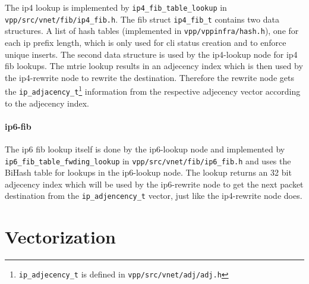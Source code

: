 



The ip4 lookup is implemented by \lstinline|ip4_fib_table_lookup| in
\lstinline|vpp/src/vnet/fib/ip4_fib.h|. The \Ac{fib} struct
\lstinline|ip4_fib_t| contains two data structures. A list of hash
tables (implemented in \lstinline|vpp/vppinfra/hash.h|), one for each
ip prefix length, which is only used for \Ac{cli} status creation and
to enforce unique inserts. The second data structure is used by the
ip4-lookup node for \Ac{ip4} \Ac{fib} lookups. The mtrie lookup
results in an adjecency index which is then used by the ip4-rewrite
node to rewrite the destination. Therefore the rewrite node gets the
\lstinline|ip_adjacency_t|\footnote{\lstinline|ip_adjecency_t| is
defined in \lstinline|vpp/src/vnet/adj/adj.h|} information from the
respective adjecency vector according to the adjecency index.


\paragraph{ip6-fib}

The \Ac{ip6} \Ac{fib} lookup itself is done by the ip6-lookup node and
implemented by \lstinline|ip6_fib_table_fwding_lookup| in
\lstinline|vpp/src/vnet/fib/ip6_fib.h| and uses the BiHash table for
lookups in the ip6-lookup node. The lookup returns an 32 bit adjecency
index which will be used by the ip6-rewrite node to get the next
packet destination from the \lstinline|ip_adjencency_t| vector, just
like the ip4-rewrite node does.



\section{Vectorization}
\label{sec:vectorization}



